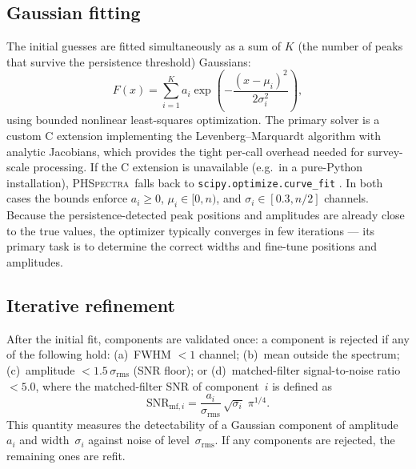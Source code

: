\documentclass[twocolumn,twocolappendix,aj]{aastex631}
\newcommand{\phspectra}{\textsc{PHSpectra}}
\newcommand{\srms}{\sigma_{\mathrm{rms}}}
\begin{document}
\subsection{Gaussian fitting}\label{sec:fitting}

The initial guesses are fitted simultaneously as a sum of $K$ (the number of peaks
that survive the persistence threshold) Gaussians:
\begin{equation}\label{eq:model}
  F(x) = \sum_{i=1}^{K} a_i \exp\!\left(-\frac{(x - \mu_i)^2}{2\sigma_i^2}\right),
\end{equation}
using bounded nonlinear least-squares optimization.  The primary solver is a
custom C extension implementing the Levenberg--Marquardt algorithm with
analytic Jacobians, which provides the tight per-call overhead needed for
survey-scale processing.  If the C extension is unavailable (e.g.\ in a
pure-Python installation), \phspectra\ falls back to
\texttt{scipy.optimize.curve\_fit} \citep{Virtanen2020}.  In both cases the
bounds enforce $a_i \geq 0$, $\mu_i \in [0, n)$, and
$\sigma_i \in [0.3, n/2]$ channels.  Because the persistence-detected peak
positions and amplitudes are already close to the true values, the optimizer
typically converges in few iterations --- its primary task is to determine
the correct widths and fine-tune positions and amplitudes.

\subsection{Iterative refinement}\label{sec:refinement}

After the initial fit, components are validated once: a component is
rejected if any of the following hold: (a)~FWHM $< 1$ channel; (b)~mean
outside the spectrum; (c)~amplitude $< 1.5\,\srms$ (SNR floor); or
(d)~matched-filter signal-to-noise ratio $< 5.0$, where the matched-filter
SNR of component~$i$ is defined as
\begin{equation}\label{eq:snr_mf}
  \mathrm{SNR}_{\mathrm{mf},i} = \frac{a_i}{\srms}\,
    \sqrt{\sigma_i}\;\pi^{1/4}.
\end{equation}
This quantity measures the detectability of a Gaussian component of
amplitude~$a_i$ and width~$\sigma_i$ against noise of level~$\srms$.
If any components are rejected, the remaining ones are refit.
\end{document}
